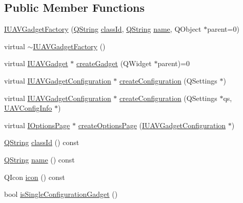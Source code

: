 \subsection*{\-Public \-Member \-Functions}
\begin{DoxyCompactItemize}
\item 
\hyperlink{group___core_plugin_gab8877ea5e27cd09cf547036e6a13f067}{\-I\-U\-A\-V\-Gadget\-Factory} (\hyperlink{group___u_a_v_objects_plugin_gab9d252f49c333c94a72f97ce3105a32d}{\-Q\-String} \hyperlink{group___core_plugin_gae2a481c6b01740fcec50deb4742b5173}{class\-Id}, \hyperlink{group___u_a_v_objects_plugin_gab9d252f49c333c94a72f97ce3105a32d}{\-Q\-String} \hyperlink{group___core_plugin_gaa2896d7403261082943a2ff0246d6a88}{name}, \-Q\-Object $\ast$parent=0)
\item 
virtual \hyperlink{group___core_plugin_ga225d48c074de84253a05eac20285115b}{$\sim$\-I\-U\-A\-V\-Gadget\-Factory} ()
\item 
virtual \hyperlink{class_core_1_1_i_u_a_v_gadget}{\-I\-U\-A\-V\-Gadget} $\ast$ \hyperlink{group___core_plugin_ga72d6fe5bbef9f4fa2333028c7a324f66}{create\-Gadget} (\-Q\-Widget $\ast$parent)=0
\item 
virtual \hyperlink{class_core_1_1_i_u_a_v_gadget_configuration}{\-I\-U\-A\-V\-Gadget\-Configuration} $\ast$ \hyperlink{group___core_plugin_gae26104d7db90a65069c2bb654ecd5026}{create\-Configuration} (\-Q\-Settings $\ast$)
\item 
virtual \hyperlink{class_core_1_1_i_u_a_v_gadget_configuration}{\-I\-U\-A\-V\-Gadget\-Configuration} $\ast$ \hyperlink{group___core_plugin_ga7b0172f2518aaf1b32b6168d5f9b2ca2}{create\-Configuration} (\-Q\-Settings $\ast$qs, \hyperlink{class_core_1_1_u_a_v_config_info}{\-U\-A\-V\-Config\-Info} $\ast$)
\item 
virtual \hyperlink{class_core_1_1_i_options_page}{\-I\-Options\-Page} $\ast$ \hyperlink{group___core_plugin_gaf11d34909f72b86882937f7a946ad0da}{create\-Options\-Page} (\hyperlink{class_core_1_1_i_u_a_v_gadget_configuration}{\-I\-U\-A\-V\-Gadget\-Configuration} $\ast$)
\item 
\hyperlink{group___u_a_v_objects_plugin_gab9d252f49c333c94a72f97ce3105a32d}{\-Q\-String} \hyperlink{group___core_plugin_gae2a481c6b01740fcec50deb4742b5173}{class\-Id} () const 
\item 
\hyperlink{group___u_a_v_objects_plugin_gab9d252f49c333c94a72f97ce3105a32d}{\-Q\-String} \hyperlink{group___core_plugin_gaa2896d7403261082943a2ff0246d6a88}{name} () const 
\item 
\-Q\-Icon \hyperlink{group___core_plugin_ga7db897c61f93d0d66f80236e4433d9f7}{icon} () const 
\item 
bool \hyperlink{group___core_plugin_gaa810e4d9774fc3183b3c7ee5d8a89e33}{is\-Single\-Configuration\-Gadget} ()
\end{DoxyCompactItemize}
